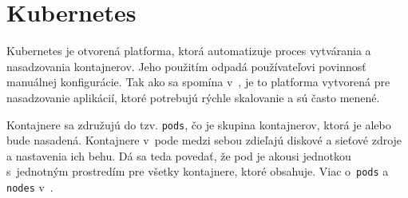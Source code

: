 \documentclass[11pt, a4paper]{article}
\begin{document}
\section{Kubernetes}
    Kubernetes je otvorená platforma, ktorá automatizuje proces vytvárania a nasadzovania kontajnerov. Jeho použitím odpadá používateľovi povinnosť manuálnej konfigurácie. Tak ako sa spomína v~\cite{Kube:2022:WhatIsKube}, je to platforma vytvorená pre nasadzovanie aplikácií, ktoré potrebujú rýchle skalovanie a sú často menené.
    
    Kontajnere sa združujú do tzv. \texttt{pods}, čo je skupina kontajnerov, ktorá je alebo bude nasadená. Kontajnere v~pode medzi sebou zdieľajú diskové a sieťové zdroje a nastavenia ich behu. Dá sa teda povedať, že pod je akousi jednotkou s~jednotným prostredím pre všetky kontajnere, ktoré obsahuje. Viac o~\texttt{pods} a \texttt{nodes} v~\cite{Docker:2020:Kube}.

\newpage
\renewcommand{\refname}{Literatúra}

\end{document}
